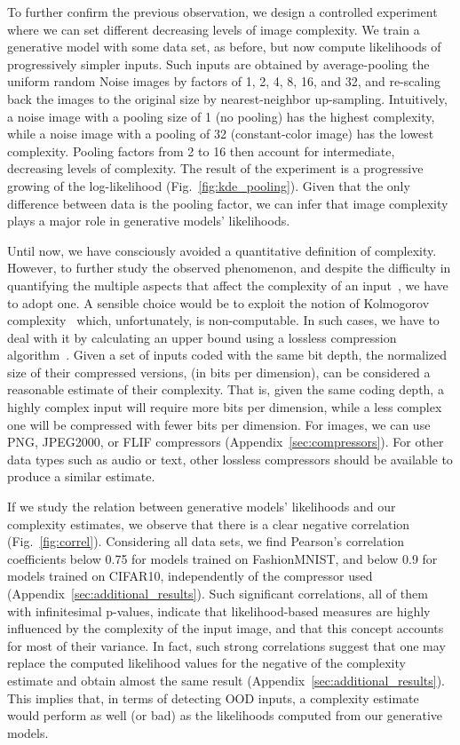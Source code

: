 \documentclass[letterpaper]{article} \usepackage{iclr2020_conference,times}
\begin{document}
To further confirm the previous observation, we design a controlled experiment where we can set different decreasing levels of image complexity. We train a generative model with some data set, as before, but now compute likelihoods of progressively simpler inputs. Such inputs are obtained by average-pooling the uniform random Noise images by factors of 1, 2, 4, 8, 16, and 32, and re-scaling back the images to the original size by nearest-neighbor up-sampling. Intuitively, a noise image with a pooling size of 1 (no pooling) has the highest complexity, while a noise image with a pooling of 32 (constant-color image) has the lowest complexity. Pooling factors from 2 to 16 then account for intermediate, decreasing levels of complexity. The result of the experiment is a progressive growing of the log-likelihood  (Fig.~\ref{fig:kde_pooling}). Given that the only difference between data is the pooling factor, we can infer that image complexity plays a major role in generative models' likelihoods.

Until now, we have consciously avoided a quantitative definition of complexity. However, to further study the observed phenomenon, and despite the difficulty in quantifying the multiple aspects that affect the complexity of an input~\citep[cf.][]{Lloyd01CSM}, we have to adopt one. A sensible choice would be to exploit the notion of Kolmogorov complexity~\citep{Kolmogorov63SSA} which, unfortunately, is non-computable. In such cases, we have to deal with it by calculating an upper bound using a lossless compression algorithm~\citep{Cover06BOOK}. Given a set of inputs  coded with the same bit depth, the normalized size of their compressed versions,  (in bits per dimension), can be considered a reasonable estimate of their complexity. That is, given the same coding depth, a highly complex input will require more bits per dimension, while a less complex one will be compressed with fewer bits per dimension. For images, we can use PNG, JPEG2000, or FLIF compressors (Appendix~\ref{sec:compressors}). For other data types such as audio or text, other lossless compressors should be available to produce a similar estimate. 

If we study the relation between generative models' likelihoods and our complexity estimates, we observe that there is a clear negative correlation (Fig.~\ref{fig:correl}). Considering all data sets, we find Pearson's correlation coefficients below 0.75 for models trained on FashionMNIST, and below 0.9 for models trained on CIFAR10, independently of the compressor used (Appendix~\ref{sec:additional_results}). Such significant correlations, all of them with infinitesimal p-values, indicate that likelihood-based measures are highly influenced by the complexity of the input image, and that this concept accounts for most of their variance. In fact, such strong correlations suggest that one may replace the computed likelihood values for the negative of the complexity estimate and obtain almost the same result (Appendix~\ref{sec:additional_results}). This implies that, in terms of detecting OOD inputs, a complexity estimate would perform as well (or bad) as the likelihoods computed from our generative models.
\end{document}
